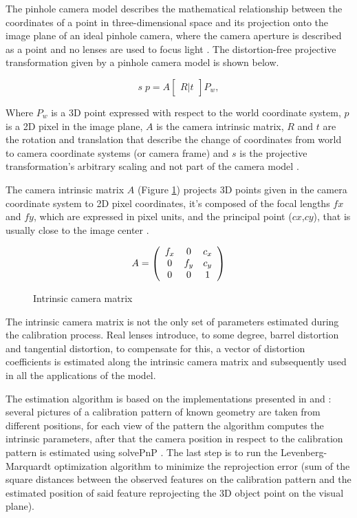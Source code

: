 The pinhole camera model describes the mathematical relationship between the coordinates of a point in three-dimensional space and its projection onto the image plane of an ideal pinhole camera, where the camera aperture is described as a point and no lenses are used to focus light \cite{wikipinhole}.
The distortion-free projective transformation given by a pinhole camera model is shown below.

\[s \; p = A \begin{bmatrix} R|t \end{bmatrix} P_w,\]

Where \(P_w\) is a 3D point expressed with respect to the world coordinate system, \(p\) is a 2D pixel in the image plane, \(A\) is the camera intrinsic matrix, \(R\) and \(t\) are the rotation and translation that describe the change of coordinates from world to camera coordinate systems (or camera frame) and \(s\) is the projective transformation's arbitrary scaling and not part of the camera model \cite{opencvcalib}.

The camera intrinsic matrix \(A\) (Figure \ref{fig:camera_matrix}) projects 3D points given in the camera coordinate system to 2D pixel coordinates, it's composed of the focal lengths \(fx\) and \(fy\), which are expressed in pixel units, and the principal point (\(cx\),\(cy\)), that is usually close to the image center \cite{opencvcalib} \cite{888718}.

\begin{figure}[h]
\caption{Intrinsic camera matrix}
\label{fig:camera_matrix}
\[A = \left (
  \begin{array}{ c c c}
  f_x & 0   & c_x \\
   0  & f_y & c_y \\
   0  & 0   & 1 \\
  \end{array}
\right )\]
\end{figure}


The intrinsic camera matrix is not the only set of parameters estimated during the calibration process. Real lenses introduce, to some degree, barrel distortion and tangential distortion, to compensate for this, a vector of distortion coefficients is estimated along the intrinsic camera matrix and subsequently used in all the applications of the model.\newline


The estimation algorithm is based on the implementations presented in  \cite{888718} and \cite{matlab}: several pictures of a calibration pattern of known geometry are taken from different positions, for each view of the pattern the algorithm computes the intrinsic parameters, after that the camera position in respect to the calibration pattern is estimated using solvePnP \cite{opencvsolvepnp}. The last step is to run the Levenberg-Marquardt optimization algorithm to minimize the reprojection error (sum of the square distances between the observed features on the calibration pattern and the estimated position of said feature reprojecting the 3D object point on the visual plane).

